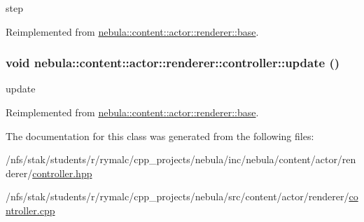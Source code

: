 step 

Reimplemented from \hyperlink{classnebula_1_1content_1_1actor_1_1renderer_1_1base_afaa86ca71b54c9d548b073f0cf23a41b}{nebula::content::actor::renderer::base}.\hypertarget{classnebula_1_1content_1_1actor_1_1renderer_1_1controller_ae71ff273d2d404f4b89de60ad0e21234}{
\subsubsection[{update}]{\setlength{\rightskip}{0pt plus 5cm}void nebula::content::actor::renderer::controller::update ()}}
\label{classnebula_1_1content_1_1actor_1_1renderer_1_1controller_ae71ff273d2d404f4b89de60ad0e21234}


update 

Reimplemented from \hyperlink{classnebula_1_1content_1_1actor_1_1renderer_1_1base_afcde5bb9124d7a6b81053c15b4322e0e}{nebula::content::actor::renderer::base}.

The documentation for this class was generated from the following files:\begin{DoxyCompactItemize}
\item 
/nfs/stak/students/r/rymalc/cpp\_\-projects/nebula/inc/nebula/content/actor/renderer/\hyperlink{renderer_2controller_8hpp}{controller.hpp}\item 
/nfs/stak/students/r/rymalc/cpp\_\-projects/nebula/src/content/actor/renderer/\hyperlink{renderer_2controller_8cpp}{controller.cpp}\end{DoxyCompactItemize}

